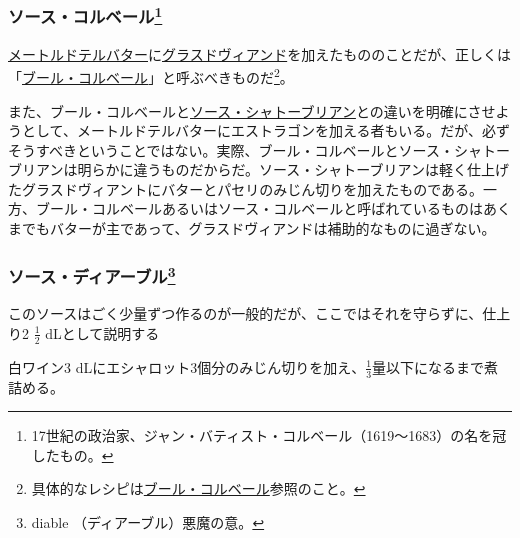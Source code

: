 \begin{recette}
{\subsubsection[ソース・コルベール]{\texorpdfstring{ソース・コルベール\footnote{17世紀の政治家、ジャン・バティスト・コルベール（1619〜1683）の名を冠したもの。}}{ソース・コルベール}}\label{sauce-colbert}}



\protect\hyperlink{beurre-maitre-d-hotel}{メートルドテルバター}に\protect\hyperlink{glace-de-viande}{グラスドヴィアンド}を加えたもののことだが、正しくは「\protect\hyperlink{beurre-colbert}{ブール・コルベール}」と呼ぶべきものだ\footnote{具体的なレシピは\protect\hyperlink{beurre-colbert}{ブール・コルベール}参照のこと。}。

また、ブール・コルベールと\protect\hyperlink{sauce-chateaubriand}{ソース・シャトーブリアン}との違いを明確にさせようとして、メートルドテルバターにエストラゴンを加える者もいる。だが、必ずそうすべきということではない。実際、ブール・コルベールとソース・シャトーブリアンは明らかに違うものだからだ。ソース・シャトーブリアンは軽く仕上げたグラスドヴィアントにバターとパセリのみじん切りを加えたものである。一方、ブール・コルベールあるいはソース・コルベールと呼ばれているものはあくまでもバターが主であって、グラスドヴィアンドは補助的なものに過ぎない。

\hypertarget{sauce-diable}{%
\subsubsection[ソース・ディアーブル]{\texorpdfstring{ソース・ディアーブル\footnote{diable
  （ディアーブル）悪魔の意。}}{ソース・ディアーブル}}\label{sauce-diable}}



このソースはごく少量ずつ作るのが一般的だが、ここではそれを守らずに、仕上り2
\(\frac{1}{2}\) dLとして説明する

白ワイン3
dLにエシャロット3個分のみじん切りを加え、\(\frac{1}{3}\)量以下になるまで煮詰める。


\end{recette}
